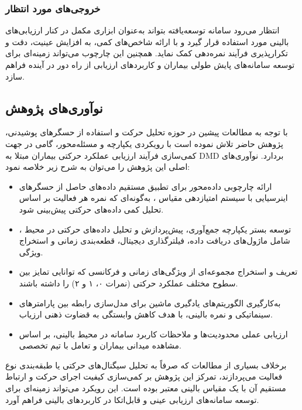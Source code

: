 \subsubsection*{خروجی‌های مورد انتظار}

انتظار می‌رود سامانه توسعه‌یافته بتواند به‌عنوان ابزاری مکمل در کنار ارزیابی‌های بالینی مورد استفاده قرار گیرد و با ارائه شاخص‌های کمی، به افزایش عینیت، دقت و تکرارپذیری فرآیند نمره‌دهی کمک نماید. همچنین این چارچوب می‌تواند زمینه‌ای برای توسعه سامانه‌های پایش طولی بیماران و کاربردهای ارزیابی از راه دور در آینده فراهم سازد.

\subsection{نوآوری‌های پژوهش}

با توجه به مطالعات پیشین در حوزه تحلیل حرکت و استفاده از حسگرهای پوشیدنی، پژوهش حاضر تلاش نموده است با رویکردی یکپارچه و مسئله‌محور، گامی در جهت کمی‌سازی فرآیند ارزیابی عملکرد حرکتی بیماران مبتلا به DMD بردارد. نوآوری‌های اصلی این پژوهش را می‌توان به شرح زیر خلاصه نمود:

\begin{itemize}
	\item ارائه چارچوبی داده‌محور برای تطبیق مستقیم داده‌های حاصل از حسگرهای اینرسیایی با سیستم امتیازدهی مقیاس ، به‌گونه‌ای که نمره هر فعالیت بر اساس تحلیل کمی داده‌های حرکتی پیش‌بینی شود.
	
	\item توسعه بستر یکپارچه جمع‌آوری، پیش‌پردازش و تحلیل داده‌های حرکتی در محیط ، شامل ماژول‌های دریافت داده، فیلترگذاری دیجیتال، قطعه‌بندی زمانی و استخراج ویژگی.
	
	\item تعریف و استخراج مجموعه‌ای از ویژگی‌های زمانی و فرکانسی که توانایی تمایز بین سطوح مختلف عملکرد حرکتی (نمرات ۰، ۱ و ۲) را داشته باشند.
	
	\item به‌کارگیری الگوریتم‌های یادگیری ماشین برای مدل‌سازی رابطه بین پارامترهای سینماتیکی و نمره بالینی، با هدف کاهش وابستگی به قضاوت ذهنی ارزیاب.
	
	\item ارزیابی عملی محدودیت‌ها و ملاحظات کاربرد سامانه در محیط بالینی، بر اساس مشاهده میدانی بیماران و تعامل با تیم تخصصی.
\end{itemize}

برخلاف بسیاری از مطالعات که صرفاً به تحلیل سیگنال‌های حرکتی یا طبقه‌بندی نوع فعالیت می‌پردازند، تمرکز این پژوهش بر کمی‌سازی کیفیت اجرای حرکت و ارتباط مستقیم آن با یک مقیاس بالینی معتبر بوده است. این رویکرد می‌تواند زمینه‌ای برای توسعه سامانه‌های ارزیابی عینی و قابل‌اتکا در کاربردهای بالینی فراهم آورد.

